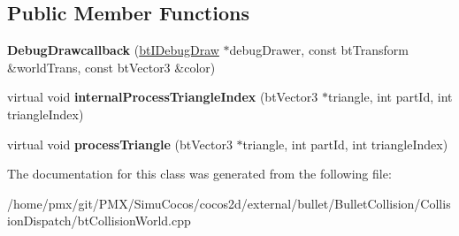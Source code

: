 \subsection*{Public Member Functions}
\begin{DoxyCompactItemize}
\item 
\mbox{\label{classDebugDrawcallback_a2124bd9a7f4f2b688ed41c31d2f271a3}} 
{\bfseries Debug\+Drawcallback} (\hyperlink{classbtIDebugDraw}{bt\+I\+Debug\+Draw} $\ast$debug\+Drawer, const bt\+Transform \&world\+Trans, const bt\+Vector3 \&color)
\item 
\mbox{\label{classDebugDrawcallback_a01bb1ddb65580dd36fbf86c4183128de}} 
virtual void {\bfseries internal\+Process\+Triangle\+Index} (bt\+Vector3 $\ast$triangle, int part\+Id, int triangle\+Index)
\item 
\mbox{\label{classDebugDrawcallback_a0b0801af46f9be0f0f99e43c6318d9fa}} 
virtual void {\bfseries process\+Triangle} (bt\+Vector3 $\ast$triangle, int part\+Id, int triangle\+Index)
\end{DoxyCompactItemize}


The documentation for this class was generated from the following file\+:\begin{DoxyCompactItemize}
\item 
/home/pmx/git/\+P\+M\+X/\+Simu\+Cocos/cocos2d/external/bullet/\+Bullet\+Collision/\+Collision\+Dispatch/bt\+Collision\+World.\+cpp\end{DoxyCompactItemize}
